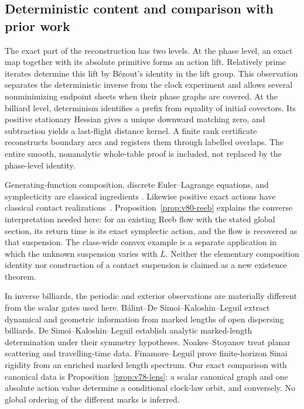 \subsection{Deterministic content and comparison with prior work}

The exact part of the reconstruction has two levels.  At the phase
level, an exact map together with its absolute primitive forms an action
lift.  Relatively prime iterates determine this lift by B\'ezout's
identity in the lift group.  This observation separates the deterministic
inverse from the clock experiment and allows several nonminimizing
endpoint sheets when their phase graphs are covered.  At the billiard
level, determinism identifies a prefix from equality of initial
covectors.  Its positive stationary Hessian gives a unique downward
matching zero, and subtraction yields a last-flight distance kernel.
A finite rank certificate reconstructs boundary arcs and registers
them through labelled overlaps.  The entire smooth, nonanalytic
whole-table proof is included, not replaced by the phase-level identity.

Generating-function composition, discrete Euler--Lagrange equations,
and symplecticity are classical ingredients
\cite{MarsdenWest2001,LallWest2006}.  Likewise positive exact actions
have classical contact realizations~\cite{Hutchings2016}.
Proposition~\ref{prop:v80-reeb} explains the converse interpretation
needed here: for an existing Reeb flow with the stated global section,
its return time is its exact symplectic action, and the flow is recovered
as that suspension.  The class-wide convex example is a separate
application in which the unknown suspension varies with $L$.
Neither the elementary composition identity nor construction of a
contact suspension is claimed as a new existence theorem.

In inverse billiards, the periodic and exterior observations are
materially different from the scalar gates used here.
B\'alint--De Simoi--Kaloshin--Leguil
\cite{BalintDeSimoiKaloshinLeguil2020} extract dynamical and geometric
information from marked lengths of open dispersing billiards.
De Simoi--Kaloshin--Leguil \cite{DeSimoiKaloshinLeguil2023} establish
analytic marked-length determination under their symmetry hypotheses.
Noakes--Stoyanov \cite{NoakesStoyanov2020} treat planar scattering and
travelling-time data.  Finamore--Leguil \cite{FinamoreLeguil} prove
finite-horizon Sinai rigidity from an enriched marked length spectrum.
Our exact comparison with canonical data is
Proposition~\ref{prop:v78-lens}: a scalar canonical graph and one
absolute action value determine a conditional clock-law orbit, and
conversely.  No global ordering of the different marks is inferred.

